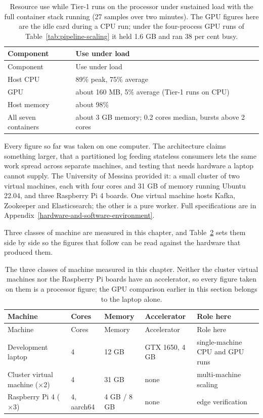 \begin{longtable}{@{}ll@{}}
\caption{Resource use while Tier-1 runs on the processor under sustained load with the full container stack running (27 samples over two minutes). The GPU figures here are the idle card during a CPU run; under the four-process GPU runs of Table~\ref{tab:pipeline-scaling} it held 1.6 GB and ran 38 per cent busy.}\label{tab:resource}\tabularnewline
\toprule
Component & Use under load \\
\midrule
\endfirsthead
\toprule
Component & Use under load \\
\midrule
\endhead
\bottomrule
\endlastfoot
Host CPU & 89\% peak, 75\% average \\
GPU & about 160 MB, 5\% average (Tier-1 runs on CPU) \\
Host memory & about 98\% \\
All seven containers & about 3 GB memory; 0.2 cores median, bursts above 2 cores \\
\end{longtable}

Every figure so far was taken on one computer. The architecture claims something larger, that a partitioned log feeding stateless consumers lets the same work spread across separate machines, and testing that needs hardware a laptop cannot supply. The University of Messina provided it: a small cluster of two virtual machines, each with four cores and 31 GB of memory running Ubuntu 22.04, and three Raspberry Pi 4 boards. One virtual machine hosts Kafka, Zookeeper and Elasticsearch; the other is a pure worker. Full specifications are in Appendix~\ref{hardware-and-software-environment}.

Three classes of machine are measured in this chapter, and Table~\ref{tab:machines} sets them side by side so the figures that follow can be read against the hardware that produced them.

\begin{longtable}{@{}lllll@{}}
\caption{The three classes of machine measured in this chapter. Neither the cluster virtual machines nor the Raspberry Pi boards have an accelerator, so every figure taken on them is a processor figure; the GPU comparison earlier in this section belongs to the laptop alone.}\label{tab:machines}\tabularnewline
\toprule
Machine & Cores & Memory & Accelerator & Role here \\
\midrule
\endfirsthead
\toprule
Machine & Cores & Memory & Accelerator & Role here \\
\midrule
\endhead
\bottomrule
\endlastfoot
Development laptop & 4 & 12 GB & GTX 1650, 4 GB & single-machine CPU and GPU runs \\
Cluster virtual machine ($\times$2) & 4 & 31 GB & none & multi-machine scaling \\
Raspberry Pi 4 ($\times$3) & 4, aarch64 & 4 GB / 8 GB & none & edge verification \\
\end{longtable}

